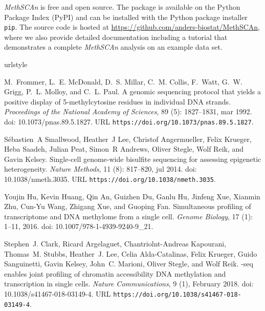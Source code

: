 \documentclass[10pt]{article}
\begin{document}
\textit{MethSCAn} is free and open source.
The package is available on the Python Package Index (PyPI) and can be installed with the Python package installer \texttt{pip}.
The source code is hosted at \href{https://github.com/anders-biostat/MethSCAn}{https://github.com/anders-biostat/MethSCAn}, where we also provide detailed documentation including a tutorial that demonstrates a complete \textit{MethSCAn} analysis on an example data set.


\begin{thebibliography}{31}
	\providecommand{\natexlab}[1]{#1}
	\providecommand{\url}[1]{\texttt{#1}}
	\expandafter\ifx\csname urlstyle\endcsname\relax
	\providecommand{\doi}[1]{doi: #1}\else
	\providecommand{\doi}{doi: \begingroup \urlstyle{rm}\Url}\fi
	
	M.~Frommer, L.~E. McDonald, D.~S. Millar, C.~M. Collis, F.~Watt, G.~W. Grigg,
	P.~L. Molloy, and C.~L. Paul.
	\newblock A genomic sequencing protocol that yields a positive display of
	5-methylcytosine residues in individual {DNA} strands.
	\newblock \emph{Proceedings of the National Academy of Sciences}, 89
	(5): 1827--1831, mar 1992.
	\newblock \doi{10.1073/pnas.89.5.1827}.
	\newblock URL \url{https://doi.org/10.1073/pnas.89.5.1827}.
	
	S{\'{e}}bastien~A Smallwood, Heather~J Lee, Christof Angermueller, Felix
	Krueger, Heba Saadeh, Julian Peat, Simon~R Andrews, Oliver Stegle, Wolf Reik,
	and Gavin Kelsey.
	\newblock Single-cell genome-wide bisulfite sequencing for assessing epigenetic
	heterogeneity.
	\newblock \emph{Nature Methods}, 11 (8): 817--820, jul 2014.
	\newblock \doi{10.1038/nmeth.3035}.
	\newblock URL \url{https://doi.org/10.1038/nmeth.3035}.
	
	Youjin Hu, Kevin Huang, Qin An, Guizhen Du, Ganlu Hu, Jinfeng Xue, Xianmin Zhu,
	Cun-Yu Wang, Zhigang Xue, and Guoping Fan.
	\newblock Simultaneous profiling of transcriptome and {DNA} methylome from a
	single cell.
	\newblock \emph{Genome Biology}, 17 (1): 1--11, 2016.
	\newblock \doi{10.1007/978-1-4939-9240-9_21}.
	
	Stephen~J. Clark, Ricard Argelaguet, Chantriolnt-Andreas Kapourani, Thomas~M.
	Stubbs, Heather~J. Lee, Celia Alda-Catalinas, Felix Krueger, Guido
	Sanguinetti, Gavin Kelsey, John~C. Marioni, Oliver Stegle, and Wolf Reik.
	-seq enables joint profiling of chromatin accessibility {DNA}
	methylation and transcription in single cells.
	\newblock \emph{Nature Communications}, 9 (1), February 2018.
	\newblock \doi{10.1038/s41467-018-03149-4}.
	\newblock URL \url{https://doi.org/10.1038/s41467-018-03149-4}.
	

\end{thebibliography}
\end{document}
